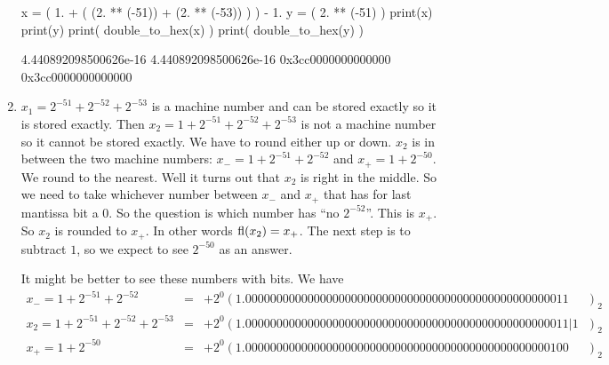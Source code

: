 \documentclass[pdftex,11pt]{article}
\begin{document}
\begin{enumerate}
\begin{python}
x = ( 1. + ( (2. ** (-51)) + (2. ** (-53)) ) ) - 1.
y = ( 2. ** (-51) )
print(x)
print(y)
print( double_to_hex(x) )
print( double_to_hex(y) )
\end{python}
\begin{pythonoutput}
4.440892098500626e-16
4.440892098500626e-16
0x3cc0000000000000
0x3cc0000000000000
\end{pythonoutput}





\begin{comment}
\underline{Matlab Check}: We check that
\begin{verbatim}
( (1 + (2^(-51) + 2^(-53))) - 1 ) - 2^(-51)
\end{verbatim}
is exactly
\begin{verbatim}
0
\end{verbatim}
\end{comment}

\item $x_1 = 2^{-51} + 2^{-52} + 2^{-53}$ is a machine number and can be stored exactly so it is stored exactly.
Then $x_2 = 1 + 2^{-51} + 2^{-52} + 2^{-53}$ is not a machine number so it cannot be stored exactly. We have to round either up or down. 
$x_2$ is in between the two machine numbers: $x_-=1 + 2^{-51} + 2^{-52}$ and $x_+=1 + 2^{-50} $.
We round to the nearest. Well it turns out that $x_2$ is right in the middle. 
So we need to take whichever number between $x_-$ and $x_+$ that has for last mantissa bit a $0$. 
So the question is which number has ``no $2^{-52}$''. This is $x_+$.
So $x_2$ is rounded to $x_+$. In other words $\textmd{fl}(x_2)=x_+$. 
The next step is to subtract $1$, so we expect to see $2^{-50}$ as an answer.
\begin{center}
\end{center}


It might be better to see these numbers with bits. 
We have
\begin{eqnarray}
 \nonumber x_- = 1 + 2^{-51} + 2^{-52}            & = &  + 2^{0} ( 1.0000000000000000000000000000000000000000000000000011\phantom{|1}~~~)_2\\
 \nonumber x_2 = 1 + 2^{-51} + 2^{-52} + 2^{-53}  & = &  + 2^{0} ( 1.0000000000000000000000000000000000000000000000000011|1~~~)_2\\ 
 \nonumber x_+ = 1 + 2^{-50}                      & = &  + 2^{0} ( 1.0000000000000000000000000000000000000000000000000100\phantom{|1}~~~)_2
\end{eqnarray}





\end{enumerate}
\end{document}
